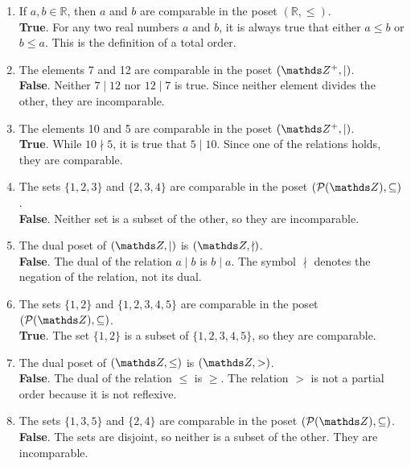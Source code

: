 \documentclass[10pt]{article}
\theoremstyle{definition}
\theoremstyle{plain}
\numberwithin{equation}{section}
\begin{document}
\begin{enumerate}
  \item If $a, b \in \mathbb{R}$, then $a$ and $b$ are comparable in the poset $(\mathbb{R}, \leq)$. \\
  \textbf{True}. For any two real numbers $a$ and $b$, it is always true that either $a \leq b$ or $b \leq a$. This is the definition of a total order.

  \item The elements 7 and 12 are comparable in the poset $(\setZ^{+}, \mid)$. \\
  \textbf{False}. Neither $7 \mid 12$ nor $12 \mid 7$ is true. Since neither element divides the other, they are incomparable.

  \item The elements 10 and 5 are comparable in the poset $(\setZ^{+}, \mid)$. \\
  \textbf{True}. While $10 \nmid 5$, it is true that $5 \mid 10$. Since one of the relations holds, they are comparable.

  \item The sets $\{1,2,3\}$ and $\{2,3,4\}$ are comparable in the poset $(\mathcal{P}(\setZ), \subseteq)$. \\
  \textbf{False}. Neither set is a subset of the other, so they are incomparable.

  \item The dual poset of $(\setZ, \mid)$ is $(\setZ, \nmid)$. \\
  \textbf{False}. The dual of the relation $a \mid b$ is $b \mid a$. The symbol $\nmid$ denotes the negation of the relation, not its dual.

  \item The sets $\{1,2\}$ and $\{1,2,3,4,5\}$ are comparable in the poset $(\mathcal{P}(\setZ), \subseteq)$. \\
  \textbf{True}. The set $\{1, 2\}$ is a subset of $\{1, 2, 3, 4, 5\}$, so they are comparable.

  \item The dual poset of $(\setZ, \leq)$ is $(\setZ,>)$. \\
  \textbf{False}. The dual of the relation $\leq$ is $\geq$. The relation $>$ is not a partial order because it is not reflexive.

  \item The sets $\{1,3,5\}$ and $\{2,4\}$ are comparable in the poset $(\mathcal{P}(\setZ), \subseteq)$. \\
  \textbf{False}. The sets are disjoint, so neither is a subset of the other. They are incomparable.


\end{enumerate}
\end{document}
